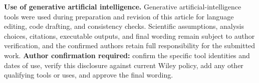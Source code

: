 \textbf{Use of generative artificial intelligence.} Generative artificial-intelligence tools were used during preparation and revision of this article for language editing, code drafting, and consistency checks. Scientific assumptions, analysis choices, citations, executable outputs, and final wording remain subject to author verification, and the confirmed authors retain full responsibility for the submitted work. \textbf{Author confirmation required:} confirm the specific tool identities and dates of use, verify this disclosure against current Wiley policy, add any other qualifying tools or uses, and approve the final wording.
